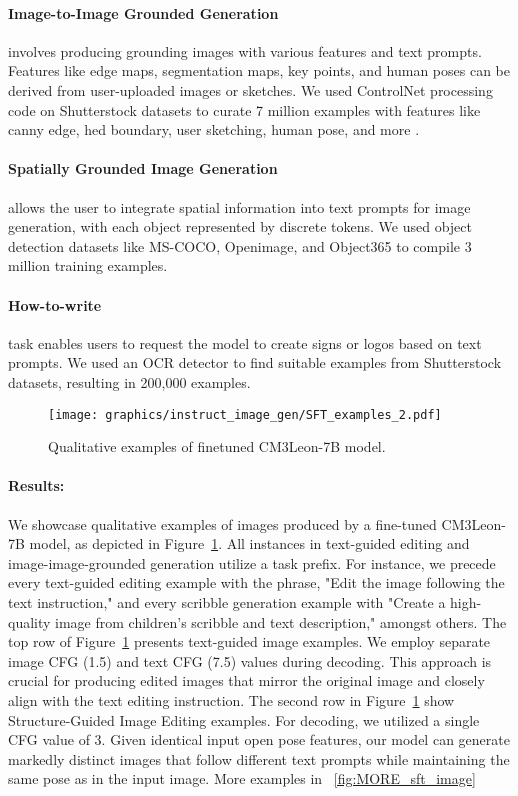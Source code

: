 \documentclass{article}
\begin{document}
\paragraph{Image-to-Image Grounded Generation} involves producing grounding images with various features and text prompts. Features like edge maps, segmentation maps, key points, and human poses can be derived from user-uploaded images or sketches. We used ControlNet processing code on Shutterstock datasets to curate 7 million examples with features like canny edge, hed boundary, user sketching, human pose, and more \citep{controlnet}.
\paragraph{Spatially Grounded Image Generation} allows the user to integrate spatial information into text prompts for image generation, with each object represented by discrete tokens. We used object detection datasets like MS-COCO, Openimage, and Object365 to compile 3 million training examples\citep{mscoco,openimage,object365}.
\paragraph{How-to-write} task enables users to request the model to create signs or logos based on text prompts. We used an OCR detector to find suitable examples from Shutterstock datasets, resulting in 200,000 examples.

\begin{figure}[h]
    \centering
    \texttt{[image: graphics/instruct\_image\_gen/SFT\_examples\_2.pdf]}
     \caption{Qualitative examples of finetuned CM3Leon-7B model.
    \label{fig:sft_image}
    }
\end{figure}


\paragraph{Results:} We showcase qualitative examples of images produced by a fine-tuned CM3Leon-7B model, as depicted in Figure~\ref{fig:sft_image}. All instances in text-guided editing and image-image-grounded generation utilize a task prefix. For instance, we precede every text-guided editing example with the phrase, "Edit the image following the text instruction," and every scribble generation example with "Create a high-quality image from children's scribble and text description," amongst others. The top row of Figure~\ref{fig:sft_image} presents text-guided image examples. We employ separate image CFG (1.5) and text CFG (7.5) values during decoding. This approach is crucial for producing edited images that mirror the original image and closely align with the text editing instruction. The second row in Figure~\ref{fig:sft_image} show Structure-Guided Image Editing examples. For decoding, we utilized a single CFG value of 3. Given identical input open pose features, our model can generate markedly distinct images that follow different text prompts while maintaining the same pose as in the input image. More examples in ~\ref{fig:MORE_sft_image}
\end{document}
